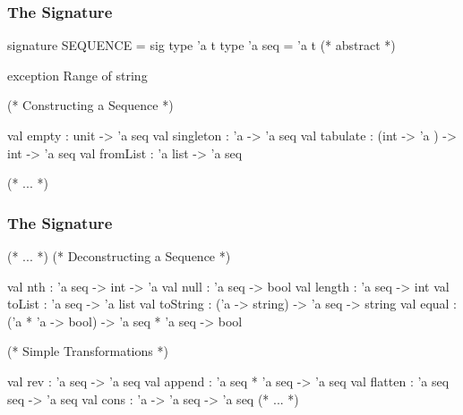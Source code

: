 \documentclass[aspectratio=169, handout]{beamer}
\begin{document}
\begin{frame}[fragile]
  \frametitle{The  Signature}

  \small
  \begin{codeblock}
    signature SEQUENCE =
      sig
        type 'a t
        type 'a seq = 'a t (* abstract *)

        exception Range of string


        (* Constructing a Sequence *)

        val empty : unit -> 'a seq
        val singleton : 'a -> 'a seq
        val tabulate : (int -> 'a ) -> int -> 'a seq
        val fromList : 'a list -> 'a seq

        (* ... *)
  \end{codeblock}
\end{frame}

\begin{frame}[fragile]
  \frametitle{The  Signature}

  \small
  \begin{codeblock}
    (* ... *)
        (* Deconstructing a Sequence *)

        val nth : 'a seq -> int -> 'a
        val null : 'a seq -> bool
        val length : 'a seq -> int
        val toList : 'a seq -> 'a list
        val toString : ('a -> string) -> 'a seq -> string
        val equal : ('a * 'a -> bool) -> 'a seq * 'a seq -> bool

        (* Simple Transformations *)

        val rev : 'a seq -> 'a seq
        val append : 'a seq * 'a seq -> 'a seq
        val flatten : 'a seq seq -> 'a seq
        val cons : 'a -> 'a seq -> 'a seq
    (* ... *)
  \end{codeblock}
\end{frame}
\end{document}
